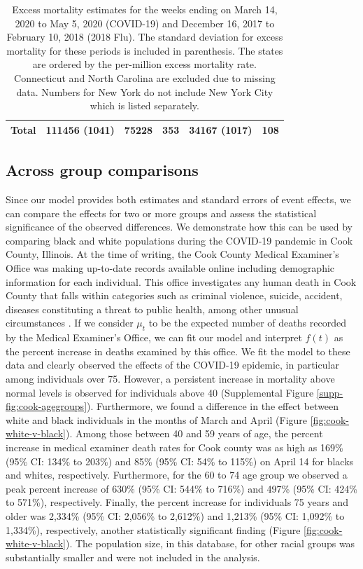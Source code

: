 \documentclass[11pt]{article}
\begin{document}
\begin{table}
\begin{tabular}{|l|lll|ll|}
 \hline
  Total & 111456 (1041) & 75228 & 353 & 34167 (1017) & 108 \\ 
  \hline
 \end{tabular}
 \caption{Excess mortality estimates for the weeks ending on March 14, 2020 to May 5, 2020 (COVID-19) and  December 16, 2017 to February 10, 2018 (2018 Flu). The standard deviation for excess mortality for these periods is included in parenthesis. The states are ordered by the per-million excess mortality rate. Connecticut and North Carolina are excluded due to missing data. Numbers for New York do not include New York City which is listed separately.}
 \label{tab:covid19-states}
 \normalsize
\end{table}
 
 

\subsection{Across group comparisons}
\label{subsec:group-comparison}
Since our model provides both estimates and standard errors of event effects, we can compare the effects for two or more groups and assess the statistical significance of the observed differences. We demonstrate how this can be used by comparing black and white populations during the COVID-19 pandemic in Cook County, Illinois. At the time of writing, the Cook County Medical Examiner's Office was making up-to-date records available online including demographic information for each individual. This office investigates any human death in Cook County that falls within categories such as criminal violence, suicide, accident, diseases constituting a threat to public health, among other unusual circumstances \cite{cookcovid19}. If we consider $\mu_t$ to be the expected number of deaths recorded by the Medical Examiner's Office, we can fit our model and interpret $f(t)$ as the percent increase in deaths examined by this office. We fit the model to these data and clearly observed the effects of the COVID-19 epidemic, in particular among individuals over 75. However, a persistent increase in mortality above normal levels is observed for individuals above 40 (Supplemental Figure \ref{supp-fig:cook-agegroups}).  Furthermore, we found a difference in the effect  between white and black individuals in the months of March and April (Figure \ref{fig:cook-white-v-black}). Among those between 40 and 59 years of age, the percent increase in medical examiner death rates for Cook county was as high as 169\% (95\% CI: 134\% to 203\%) and 85\%  (95\% CI: 54\% to 115\%) on April 14 for blacks and whites, respectively. Furthermore, for the 60 to 74 age group we observed a peak percent increase of 630\% (95\% CI: 544\% to 716\%) and 497\% (95\% CI: 424\% to 571\%), respectively. Finally, the percent increase for individuals 75 years and older was 2,334\% (95\% CI: 2,056\% to 2,612\%) and 1,213\% (95\% CI: 1,092\% to 1,334\%), respectively, another statistically significant finding (Figure \ref{fig:cook-white-v-black}).  The population size, in this database, for other racial groups was substantially smaller and were not included in the analysis.
\end{document}
